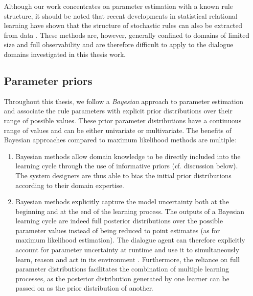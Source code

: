 Although our work concentrates on parameter estimation  with a known rule structure, it should be noted that recent developments in statistical relational learning have shown that the structure of stochastic rules can also be extracted from data \citep{PasulaZK07,Kok:2009}.  These methods are, however, generally confined to domains of limited size and full observability and are therefore difficult to apply to the dialogue domains investigated in this thesis work.  


\subsection{Parameter priors}
\label{sec:rule-params-priors}

Throughout this thesis, we follow a \textit{Bayesian} approach to parameter estimation and associate the rule parameters with explicit prior distributions over their range of possible values.  These prior parameter distributions have a continuous range of values and can be either univariate or multivariate.  The benefits of Bayesian approaches compared to maximum likelihood methods are multiple:
\begin{enumerate} 
\item Bayesian methods allow domain knowledge to be directly included into the learning cycle through the use of informative priors (cf. discussion below). The system designers are thus able to bias the initial prior distributions according to their domain expertise.
\item Bayesian methods explicitly capture the model uncertainty both at the beginning and at the end of the learning process. The outputs of a Bayesian learning cycle are indeed full posterior distributions over the possible parameter values instead of being reduced to point estimates (as for maximum likelihood estimation).  The dialogue agent can therefore explicitly account for parameter uncertainty at runtime and use it to simultaneously learn, reason and act in its environment \citep{Ross:2011}. Furthermore, the reliance on full parameter distributions facilitates the combination of multiple learning processes, as the posterior distribution generated by one learner can be passed on as the prior distribution of another. 
\end{enumerate}

